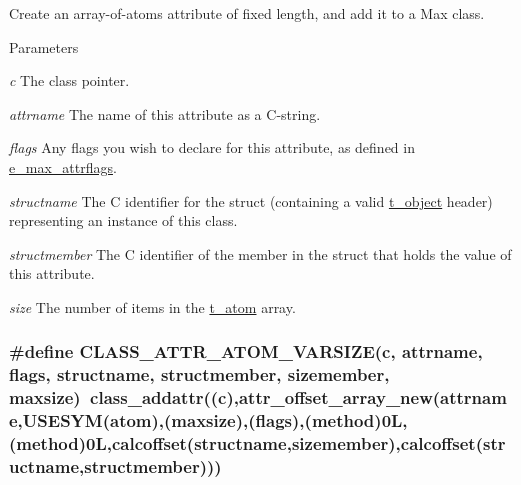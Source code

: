 Create an array-\/of-\/atoms attribute of fixed length, and add it to a Max class. 
\begin{DoxyParams}{Parameters}
\item[{\em c}]The class pointer. \item[{\em attrname}]The name of this attribute as a C-\/string. \item[{\em flags}]Any flags you wish to declare for this attribute, as defined in \hyperlink{group__attr_gaf296cfc6741bb19207f6ed8062809115}{e\_\-max\_\-attrflags}. \item[{\em structname}]The C identifier for the struct (containing a valid \hyperlink{structt__object}{t\_\-object} header) representing an instance of this class. \item[{\em structmember}]The C identifier of the member in the struct that holds the value of this attribute. \item[{\em size}]The number of items in the \hyperlink{structt__atom}{t\_\-atom} array. \end{DoxyParams}
\hypertarget{group__attr_gad27383a0ceea7d32880ee41452e480d5}{
\subsubsection[{CLASS\_\-ATTR\_\-ATOM\_\-VARSIZE}]{\setlength{\rightskip}{0pt plus 5cm}\#define CLASS\_\-ATTR\_\-ATOM\_\-VARSIZE(c, \/  attrname, \/  flags, \/  structname, \/  structmember, \/  sizemember, \/  maxsize)~class\_\-addattr((c),attr\_\-offset\_\-array\_\-new(attrname,USESYM(atom),(maxsize),(flags),({\bf method})0L,(method)0L,calcoffset(structname,sizemember),calcoffset(structname,structmember)))}}
\label{group__attr_gad27383a0ceea7d32880ee41452e480d5}



